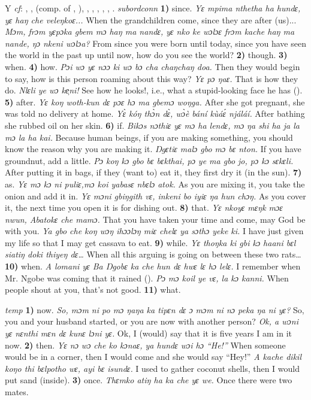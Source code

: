 \begin{letter}{Y}
 \textit{cf}: , ,  (comp. of , ), , , , , , . \textit{subordconn} \textbf{1)} since. \textit{Yɛ mpima nthetha ha hundɛ, yɛ haŋ che veleŋkoɛ...} When the grandchildren come, since they are after (us)... \textit{Mɔm, frɔm yɛpɔka gbem mɔ haŋ ma nandɛ, yɛ nko ke wɔlɔɛ frɔm kache haŋ ma nande, ŋɔ nkeni wɔlɔa?} From since you were born until today, since you have seen the world in the past up until now, how do you see the world? \textbf{2)} though. \textbf{3)} when. \textbf{4)} how. \textit{Pɔi wɔ yɛ nɔɔ ki wɔ bɔ cha chaŋchaŋ doa.} Then they would begin to say, how is this person roaming about this way? \textit{Yɛ pɔ ŋaɛ.} That is how they do. \textit{Nlɛli ye wɔ ke̹ni!} See how he looks!, i.e., what a stupid-looking face he has (\citealt{Pichl1967}). \textbf{5)} after. \textit{Yɛ koŋ woth-kun dɛ pɔɛ hɔ ma gbemɔ woŋga.} After she got pregnant, she was told no delivery at home. \textit{Yɛ̀ kóŋ thɔ̀n dɛ̀, wɔ̀è bání kùáɛ́ njáláí.} After bathing she rubbed oil on her skin. \textbf{6)} if. \textit{Bikɔs nɔthiɛ yɛ mɔ ha lendɛ, mɔ ŋa shi ha ja la mɔ la ha kai.} Because human beings, if you are making something, you should know the reason why you are making it. \textit{Ŋgɛtiɛ malɔ gbo mɔ bɛ nton.} If you have groundnut, add a little. \textit{Pɔ koŋ kɔ gbo bɛ bɛkthai, pɔ ye ma gbo jo, pɔ kɔ sɛkɛli.} After putting it in bags, if they (want to) eat it, they first dry it (in the sun). \textbf{7)} as. \textit{Yɛ mɔ kɔ ni puliɛ,mɔ koi yabasɛ nbɛlɔ atok.} As you are mixing it, you take the onion and add it in. \textit{Yɛ mɔni gbiŋgith vɛ, inkeni bo iyiɛ ŋa hun chɔŋ.} As you cover it, the next time you open it is for dishing out. \textbf{8)} that. \textit{Yɛ nkoyɛ mɛŋk mɔɛ nwun, Abatokɛ che mamɔ.} That you have taken your time and come, may God be with you. \textit{Ya gbo che koŋ wɔŋ ihɔɔlɔŋ miɛ chelɛ ya sɔthɔ yeke ki.} I have just given my life so that I may get cassava to eat. \textbf{9)} while. \textit{Yɛ thoŋka ki gbi kɔ haani bɛl siatiŋ doki thiyeŋ dɛ…} When all this arguing is going on between these two rats… \textbf{10)} when. \textit{A lomani yɛ Ba Ŋgobɛ ka che hun dɛ hwɛ lɛ hɔ lelɛ.} I remember when Mr. Ngobe was coming that it rained (\citealt{Pichl1967}). \textit{Pɔ mɔ koil ye vɛ, la kɔ kanni.} When people shout at you, that's not good. \textbf{11)} what.

 \textit{temp} \textbf{1)} now. \textit{So, mɔm ni po mɔ ŋaŋa ka tipɛn dɛ ɔ mɔm ni nɔ peka ŋa ni yɛ?} So, you and your husband started, or you are now with another person? \textit{Ok, a wɔni yɛ nɛnthi mɛn dɛ kunɛ lɔni yɛ.} Ok, I (would) say that it is five years I am in it now. \textbf{2)} then. \textit{Yɛ nɔ wɔ che ko kɔnaɛ, ya hundɛ wɔi hɔ “He!”} When someone would be in a corner, then I would come and she would say “Hey!” \textit{A kache dikil koŋo thi bɛlpotho wɛ, ayi bɛ isundɛ.} I used to gather coconut shells, then I would put sand (inside). \textbf{3)} once. \textit{Thɛmko atiŋ ha ka che yɛ we.} Once there were two mates.


\end{letter}
